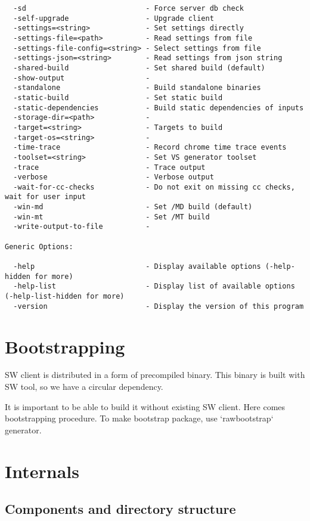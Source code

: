 \begin{verbatim}
  -sd                            - Force server db check
  -self-upgrade                  - Upgrade client
  -settings=<string>             - Set settings directly
  -settings-file=<path>          - Read settings from file
  -settings-file-config=<string> - Select settings from file
  -settings-json=<string>        - Read settings from json string
  -shared-build                  - Set shared build (default)
  -show-output                   -
  -standalone                    - Build standalone binaries
  -static-build                  - Set static build
  -static-dependencies           - Build static dependencies of inputs
  -storage-dir=<path>            -
  -target=<string>               - Targets to build
  -target-os=<string>            -
  -time-trace                    - Record chrome time trace events
  -toolset=<string>              - Set VS generator toolset
  -trace                         - Trace output
  -verbose                       - Verbose output
  -wait-for-cc-checks            - Do not exit on missing cc checks, wait for user input
  -win-md                        - Set /MD build (default)
  -win-mt                        - Set /MT build
  -write-output-to-file          -

Generic Options:

  -help                          - Display available options (-help-hidden for more)
  -help-list                     - Display list of available options (-help-list-hidden for more)
  -version                       - Display the version of this program
\end{verbatim}



\section{Bootstrapping}

SW client is distributed in a form of precompiled binary.
This binary is built with SW tool, so we have a circular dependency.

It is important to be able to build it without existing SW client.
Here comes bootstrapping procedure.
To make bootstrap package, use `rawbootstrap` generator.



\section{Internals}
\subsection{Components and directory structure}

